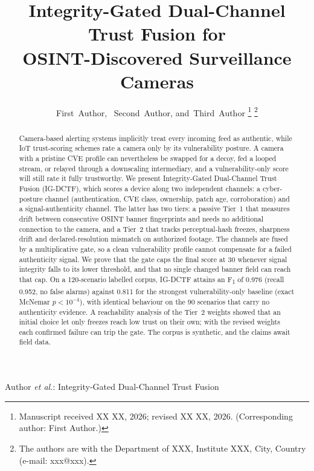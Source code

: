 \documentclass[journal]{IEEEtran}
\begin{document}
\title{Integrity-Gated Dual-Channel Trust Fusion for\\
OSINT-Discovered Surveillance Cameras}

\author{First~Author,~
        Second~Author,
        and~Third~Author%
\thanks{Manuscript received XX XX, 2026; revised XX XX, 2026. (Corresponding author: First Author.)}
\thanks{The authors are with the Department of XXX, Institute XXX, City, Country (e-mail: xxx@xxx).}}

%
{Author \MakeLowercase{\textit{et al.}}: Integrity-Gated Dual-Channel Trust Fusion}

\maketitle

\begin{abstract}
Camera-based alerting systems implicitly treat every incoming feed as authentic, while IoT trust-scoring schemes rate a camera only by its vulnerability posture. A camera with a pristine CVE profile can nevertheless be swapped for a decoy, fed a looped stream, or relayed through a downscaling intermediary, and a vulnerability-only score will still rate it fully trustworthy. We present Integrity-Gated Dual-Channel Trust Fusion (IG-DCTF), which scores a device along two independent channels: a cyber-posture channel (authentication, CVE class, ownership, patch age, corroboration) and a signal-authenticity channel. The latter has two tiers: a passive Tier~1 that measures drift between consecutive OSINT banner fingerprints and needs no additional connection to the camera, and a Tier~2 that tracks perceptual-hash freezes, sharpness drift and declared-resolution mismatch on authorized footage. The channels are fused by a multiplicative gate, so a clean vulnerability profile cannot compensate for a failed authenticity signal. We prove that the gate caps the final score at 30 whenever signal integrity falls to its lower threshold, and that no single changed banner field can reach that cap. On a 120-scenario labelled corpus, IG-DCTF attains an F\textsubscript{1} of 0.976 (recall 0.952, no false alarms) against 0.811 for the strongest vulnerability-only baseline (exact McNemar $p<10^{-4}$), with identical behaviour on the 90 scenarios that carry no authenticity evidence. A reachability analysis of the Tier~2 weights showed that an initial choice let only freezes reach low trust on their own; with the revised weights each confirmed failure can trip the gate. The corpus is synthetic, and the claims await field data.
\end{abstract}
\end{document}
